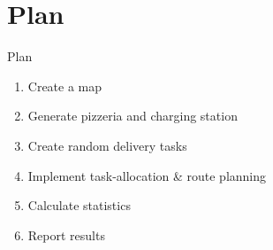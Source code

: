 \section{Plan}

\begin{frame}{Plan}
    \begin{enumerate}
    	\item Create a map
    	\item Generate pizzeria and charging station
    	\item Create random delivery tasks
    	\item Implement task-allocation \& route planning 
    	\item Calculate statistics
    	\item Report results
    \end{enumerate}
\end{frame}